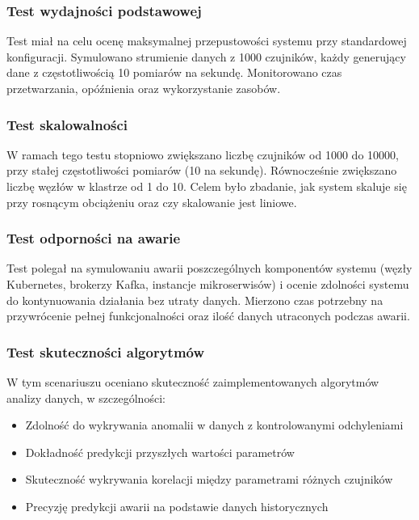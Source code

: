 \subsubsection{Test wydajności podstawowej}
\label{subsubsec:test_wydajnosci_podstawowej}

Test miał na celu ocenę maksymalnej przepustowości systemu przy standardowej konfiguracji. Symulowano strumienie danych z 1000 czujników, każdy generujący dane z częstotliwością 10 pomiarów na sekundę. Monitorowano czas przetwarzania, opóźnienia oraz wykorzystanie zasobów.

\subsubsection{Test skalowalności}
\label{subsubsec:test_skalowalnosci}

W ramach tego testu stopniowo zwiększano liczbę czujników od 1000 do 10000, przy stałej częstotliwości pomiarów (10 na sekundę). Równocześnie zwiększano liczbę węzłów w klastrze od 1 do 10. Celem było zbadanie, jak system skaluje się przy rosnącym obciążeniu oraz czy skalowanie jest liniowe.

\subsubsection{Test odporności na awarie}
\label{subsubsec:test_odpornosci}

Test polegał na symulowaniu awarii poszczególnych komponentów systemu (węzły Kubernetes, brokerzy Kafka, instancje mikroserwisów) i ocenie zdolności systemu do kontynuowania działania bez utraty danych. Mierzono czas potrzebny na przywrócenie pełnej funkcjonalności oraz ilość danych utraconych podczas awarii.

\subsubsection{Test skuteczności algorytmów}
\label{subsubsec:test_skutecznosci}

W tym scenariuszu oceniano skuteczność zaimplementowanych algorytmów analizy danych, w szczególności:

\begin{itemize}
    \item Zdolność do wykrywania anomalii w danych z kontrolowanymi odchyleniami
    \item Dokładność predykcji przyszłych wartości parametrów
    \item Skuteczność wykrywania korelacji między parametrami różnych czujników
    \item Precyzję predykcji awarii na podstawie danych historycznych
\end{itemize}

